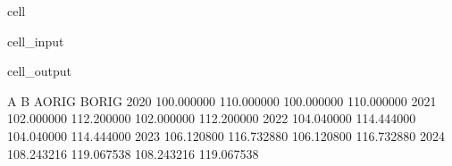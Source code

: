 \documentclass[letterpaper,10pt,english]{jupyterBook}
\begin{document}
\begin{sphinxuseclass}{cell}\begin{sphinxVerbatimInput}

\begin{sphinxuseclass}{cell_input}
\begin{sphinxVerbatim}[commandchars=\\\{\}]
  
     \PYG{p}{[}    \PYG{p}{]}
       \PYG{p}{[}\PYG{p}{]} 

\PYG{p}{[}\PYG{p}{]}\PYG{p}{[}\PYG{p}{]}
\PYG{p}{[}\PYG{p}{]}\PYG{p}{[}\PYG{p}{]}
\end{sphinxVerbatim}

\end{sphinxuseclass}\end{sphinxVerbatimInput}
\begin{sphinxVerbatimOutput}

\begin{sphinxuseclass}{cell_output}
\begin{sphinxVerbatim}[commandchars=\\\{\}]
               A           B      A\PYGZus{}ORIG      B\PYGZus{}ORIG
2020  100.000000  110.000000  100.000000  110.000000
2021  102.000000  112.200000  102.000000  112.200000
2022  104.040000  114.444000  104.040000  114.444000
2023  106.120800  116.732880  106.120800  116.732880
2024  108.243216  119.067538  108.243216  119.067538
\end{sphinxVerbatim}

\end{sphinxuseclass}\end{sphinxVerbatimOutput}

\end{sphinxuseclass}
\end{document}
